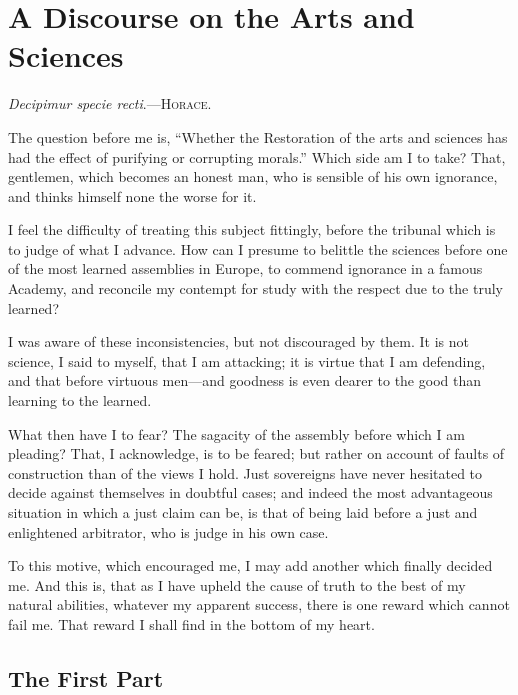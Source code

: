 
\author{Jean-Jacques Rousseau}
\chapter{A Discourse on the Arts and Sciences}

\begin{center}
\textit{Decipimur specie recti}.---\textsc{Horace}.
\end{center}

The question before me is, ``Whether the Restoration of the arts and
sciences has had the effect of purifying or corrupting morals.'' Which
side am I to take? That, gentlemen, which becomes an honest man, who
is sensible of his own ignorance, and thinks himself none the worse
for it.

I feel the difficulty of treating this subject fittingly, before the
tribunal which is to judge of what I advance. How can I presume to
belittle the sciences before one of the most learned assemblies in
Europe, to commend ignorance in a famous Academy, and reconcile my
contempt for study with the respect due to the truly learned?

I was aware of these inconsistencies, but not discouraged by them. It
is not science, I said to myself, that I am attacking; it is virtue
that I am defending, and that before virtuous men---and goodness is
even dearer to the good than learning to the learned.

What then have I to fear? The sagacity of the assembly before which I
am pleading? That, I acknowledge, is to be feared; but rather on
account of faults of construction than of the views I hold. Just
sovereigns have never hesitated to decide against themselves in
doubtful cases; and indeed the most advantageous situation in which a
just claim can be, is that of being laid before a just and enlightened
arbitrator, who is judge in his own case.

To this motive, which encouraged me, I may add another which finally
decided me. And this is, that as I have upheld the cause of truth to
the best of my natural abilities, whatever my apparent success, there
is one reward which cannot fail me. That reward I shall find in the
bottom of my heart.

\section*{The First Part}

